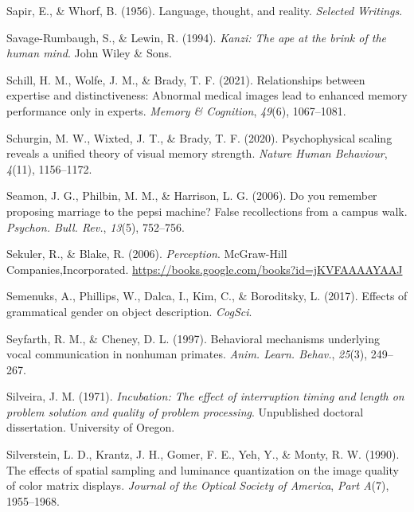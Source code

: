 \documentclass[
]{krantz}
\newlength{\cslhangindent}
\newlength{\cslentryspacingunit} %
\newenvironment{CSLReferences}[2] %
 {%
  \setlength{\parindent}{0pt}
  \ifodd #1
  \let\oldpar\par
  \def\par{\hangindent=\cslhangindent\oldpar}
  \fi
  \setlength{\parskip}{#2\cslentryspacingunit}
 }%
 {}
\begin{document}
\begin{CSLReferences}{1}{0}
\leavevmode{}%
Sapir, E., \& Whorf, B. (1956). Language, thought, and reality. \emph{Selected Writings}.

\leavevmode{}%
Savage-Rumbaugh, S., \& Lewin, R. (1994). \emph{Kanzi: The ape at the brink of the human mind}. John Wiley \& Sons.

\leavevmode{}%
Schill, H. M., Wolfe, J. M., \& Brady, T. F. (2021). Relationships between expertise and distinctiveness: Abnormal medical images lead to enhanced memory performance only in experts. \emph{Memory \& Cognition}, \emph{49}(6), 1067--1081.

\leavevmode{}%
Schurgin, M. W., Wixted, J. T., \& Brady, T. F. (2020). Psychophysical scaling reveals a unified theory of visual memory strength. \emph{Nature Human Behaviour}, \emph{4}(11), 1156--1172.

\leavevmode{}%
Seamon, J. G., Philbin, M. M., \& Harrison, L. G. (2006). Do you remember proposing marriage to the pepsi machine? False recollections from a campus walk. \emph{Psychon. Bull. Rev.}, \emph{13}(5), 752--756.

\leavevmode{}%
Sekuler, R., \& Blake, R. (2006). \emph{Perception}. McGraw-Hill Companies,Incorporated. \url{https://books.google.com/books?id=jKVFAAAAYAAJ}

\leavevmode{}%
Semenuks, A., Phillips, W., Dalca, I., Kim, C., \& Boroditsky, L. (2017). Effects of grammatical gender on object description. \emph{CogSci}.

\leavevmode{}%
Seyfarth, R. M., \& Cheney, D. L. (1997). Behavioral mechanisms underlying vocal communication in nonhuman primates. \emph{Anim. Learn. Behav.}, \emph{25}(3), 249--267.

\leavevmode{}%
Silveira, J. M. (1971). \emph{Incubation: The effect of interruption timing and length on problem solution and quality of problem processing}. Unpublished doctoral dissertation. University of Oregon.

\leavevmode{}%
Silverstein, L. D., Krantz, J. H., Gomer, F. E., Yeh, Y., \& Monty, R. W. (1990). The effects of spatial sampling and luminance quantization on the image quality of color matrix displays. \emph{Journal of the Optical Society of America}, \emph{Part A}(7), 1955--1968.


\end{CSLReferences}
\end{document}
